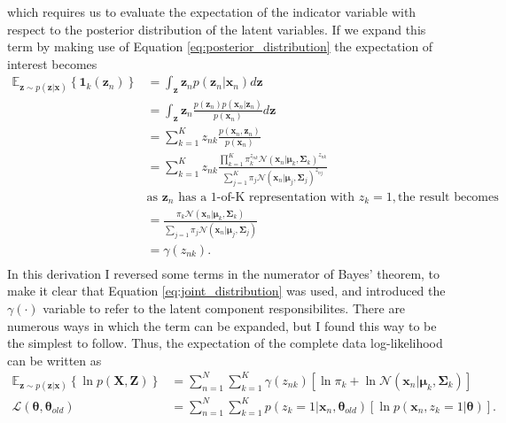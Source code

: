 \documentclass{article}
\begin{document}
which requires us to evaluate the expectation of the indicator variable with respect to the posterior distribution of the latent variables. If we expand this term by making use of Equation \eqref{eq:posterior_distribution} the expectation of interest becomes
\begin{equation}
\begin{aligned}
\mathbb{E}_{\mathbf{z} \sim p(\mathbf{z}\vert\mathbf{x})} \left\lbrace \mathbf{1}_k(\mathbf{z}_n) \right\rbrace &= \int_{\mathbf{z}} \mathbf{z}_n p(\mathbf{z}_n\vert\mathbf{x}_n)d\mathbf{z} \\
&= \int_{\mathbf{z}} \mathbf{z}_n \frac{p(\mathbf{z}_n)p(\mathbf{x}_n\vert \mathbf{z}_n)}{p(\mathbf{x}_n)} d\mathbf{z} \\
&= \sum_{k=1}^K z_{nk} \frac{p(\mathbf{x}_n, \mathbf{z}_n)}{p(\mathbf{x}_n)} \\
&=  \sum_{k=1}^K z_{nk} \frac{\prod_{k=1}^{K} \pi_k^{z_{nk}} \mathcal{N}(\mathbf{x}_n\vert \boldsymbol\mu_k, \boldsymbol\Sigma_k)^{z_{nk}}}{\sum_{j=1}^{K} \pi_j \mathcal{N}(\mathbf{x}_n \vert \boldsymbol\mu_j, \boldsymbol\Sigma_j)^{z_{nj}}} \\
& \text{as } \mathbf{z}_n \text{ has a 1-of-K representation with } z_{k} = 1, \text {the result becomes}  \\
&= \frac{\pi_k\mathcal{N}(\mathbf{x}_n\vert \boldsymbol\mu_k, \boldsymbol\Sigma_k)}{\sum_{j=1}\pi_j\mathcal{N}(\mathbf{x}_n\vert \boldsymbol\mu_j, \boldsymbol\Sigma_j)} \\
&= \gamma(z_{nk}). \\
\end{aligned}
\end{equation}
In this derivation I reversed some terms in the numerator of Bayes' theorem, to make it clear that Equation \eqref{eq:joint_distribution} was used, and introduced the $\gamma(\cdot)$ variable to refer to the latent component responsibilites. There are numerous ways in which the term can be expanded, but I found this way to be the simplest to follow. Thus, the expectation of the complete data log-likelihood can be written as
\begin{equation}\label{eq:final_complete_data_log_likelihood}
\begin{aligned}
\mathbb{E}_{\mathbf{z} \sim p(\mathbf{z}\vert\mathbf{x})} \left\lbrace \ln p(\mathbf{X}, \mathbf{Z}) \right\rbrace &=  \sum_{n=1}^{N} \sum_{k=1}^{K}  \gamma(z_{nk}) \left[ \ln \pi_k + \ln \mathcal{N}(\mathbf{x}_n \vert \boldsymbol\mu_k, \boldsymbol\Sigma_k) \right] \\
\mathcal{L}(\boldsymbol\theta, \boldsymbol\theta_{old}) &= \sum_{n=1}^{N} \sum_{k=1}^{K} p(z_k = 1\vert \mathbf{x}_n, \boldsymbol\theta_{old}) \left[ \ln p(\mathbf{x}_n, z_k = 1 \vert \boldsymbol\theta) \right].
\end{aligned}
\end{equation}
\end{document}
